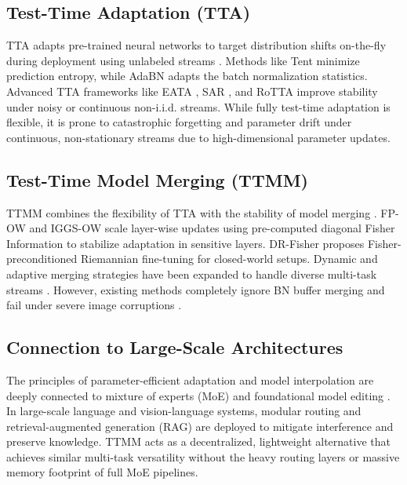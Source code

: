 \documentclass{article}
\begin{document}
\subsection{Test-Time Adaptation (TTA)}
TTA adapts pre-trained neural networks to target distribution shifts on-the-fly during deployment using unlabeled streams \cite{wang2021tent}. Methods like Tent \cite{wang2021tent} minimize prediction entropy, while AdaBN \cite{schneider2020improving} adapts the batch normalization statistics. Advanced TTA frameworks like EATA \cite{niu2022efficient}, SAR \cite{niu2023robust}, and RoTTA \cite{yuan2023robust} improve stability under noisy or continuous non-i.i.d. streams. While fully test-time adaptation is flexible, it is prone to catastrophic forgetting and parameter drift under continuous, non-stationary streams due to high-dimensional parameter updates.

\subsection{Test-Time Model Merging (TTMM)}
TTMM combines the flexibility of TTA with the stability of model merging \cite{yang2024adamerging}. FP-OW \cite{luan2026fpca} and IGGS-OW \cite{shao2026iggs} scale layer-wise updates using pre-computed diagonal Fisher Information to stabilize adaptation in sensitive layers. DR-Fisher \cite{zhao2026drfisher} proposes Fisher-preconditioned Riemannian fine-tuning for closed-world setups. Dynamic and adaptive merging strategies have been expanded to handle diverse multi-task streams \cite{zhao2024test, hubotter2025adaptive, shavit2025continual, yang2025local, imam2025sample}. However, existing methods completely ignore BN buffer merging and fail under severe image corruptions \cite{hendrycks2019benchmarking}.

\subsection{Connection to Large-Scale Architectures}
The principles of parameter-efficient adaptation and model interpolation are deeply connected to mixture of experts (MoE) \cite{shazeer2017outrageously, fedus2022switch} and foundational model editing \cite{vaswani2017attention, devlin2018bert, radford2021learning, brown2020language}. In large-scale language and vision-language systems, modular routing and retrieval-augmented generation (RAG) \cite{lewis2020retrieval} are deployed to mitigate interference and preserve knowledge. TTMM acts as a decentralized, lightweight alternative that achieves similar multi-task versatility without the heavy routing layers or massive memory footprint of full MoE pipelines.
\end{document}

